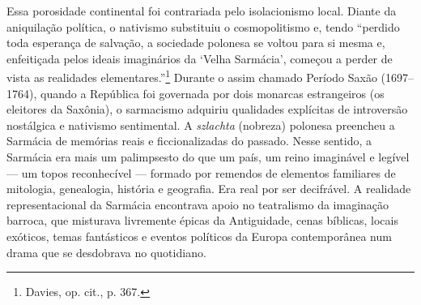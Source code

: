 Essa porosidade continental foi contrariada pelo isolacionismo local.
Diante da aniquilação política, o nativismo substituiu o cosmopolitismo
e, tendo ``perdido toda esperança de salvação, a sociedade polonesa se
voltou para si mesma e, enfeitiçada pelos ideais imaginários da `Velha
Sarmácia', começou a perder de vista as realidades
elementares.''\footnote{Davies, op. cit., p. 367.} Durante o assim
chamado Período Saxão (1697--1764), quando a República foi governada por
dois monarcas estrangeiros (os eleitores da Saxônia), o sarmacismo
adquiriu qualidades explícitas de introversão nostálgica e nativismo
sentimental. A \textit{szlachta} (nobreza) polonesa preencheu a Sarmácia
de memórias reais e ficcionalizadas do passado. Nesse sentido, a
Sarmácia era mais um palimpsesto do que um país, um reino imaginável e
legível --- um topos reconhecível --- formado por remendos de elementos
familiares de mitologia, genealogia, história e geografia. Era real por
ser decifrável. A realidade representacional da Sarmácia encontrava
apoio no teatralismo da imaginação barroca, que misturava livremente
épicas da Antiguidade, cenas bíblicas, locais exóticos, temas
fantásticos e eventos políticos da Europa contemporânea num drama que se
desdobrava no quotidiano.

